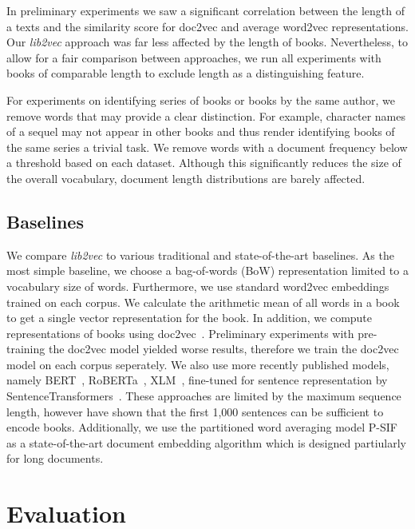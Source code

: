 \documentclass[11pt]{article}
\begin{document}
In preliminary experiments we saw a significant correlation between the length of a texts and the similarity score for doc2vec and average word2vec representations.
Our \emph{lib2vec} approach was far less affected by the length of books.
Nevertheless, to allow for a fair comparison between approaches, we run all experiments with books of comparable length to exclude length as a distinguishing feature.

For experiments on identifying series of books or books by the same author, we remove words that may provide a clear distinction.
For example, character names of a sequel may not appear in other books and thus render identifying books of the same series a trivial task.
We remove words with a document frequency below a threshold based on each dataset.
Although this significantly reduces the size of the overall vocabulary, document length distributions are barely affected.

\subsection{Baselines}

We compare \emph{lib2vec} to various traditional and state-of-the-art baselines.
As the most simple baseline, we choose a bag-of-words (BoW) representation limited to a vocabulary size of  words.
Furthermore, we use standard word2vec embeddings trained on each corpus.
We calculate the arithmetic mean of all words in a book to get a single vector representation for the book.
In addition, we compute representations of books using doc2vec~\cite{le_distributed_2014}.
Preliminary experiments with pre-training the doc2vec model yielded worse results, therefore we train the doc2vec model on each corpus seperately.
We also use more recently published models, namely BERT~\citep{devlin_bert_2019}, RoBERTa~\citep{liu2019roberta}, XLM~\citep{conneau2019cross}, fine-tuned for sentence representation by SentenceTransformers~\citep{reimers-2019-sentence-bert}.
These approaches are limited by the maximum sequence length, however \citet{khalifa_will_2020} have shown that the first 1,000 sentences can be sufficient to encode books.
Additionally, we use the partitioned word averaging model P-SIF~\citep{gupta_p-sif_2020} as a state-of-the-art document embedding algorithm which is designed partiularly for long documents.

\section{Evaluation}
\end{document}
